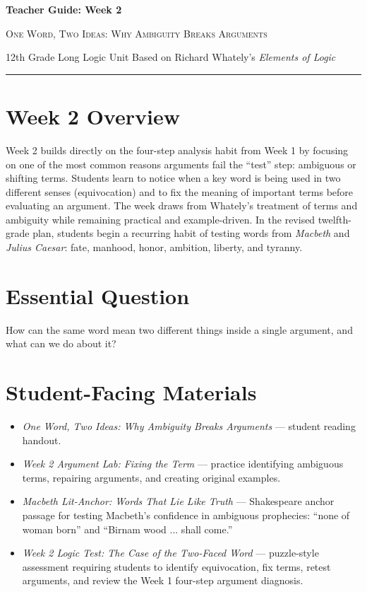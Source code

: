 \documentclass[12pt]{article}
\begin{document}
\begin{center}
{\LARGE\bfseries Teacher Guide: Week 2}\par\vspace{0.25em}
{\large\scshape One Word, Two Ideas: Why Ambiguity Breaks Arguments}\par\vspace{0.4em}
{12th Grade Long Logic Unit Based on Richard Whately's \textit{Elements of Logic}}\par\vspace{0.6em}
\rule{0.82\textwidth}{0.4pt}
\end{center}

\section*{Week 2 Overview}
Week 2 builds directly on the four-step analysis habit from Week 1 by focusing on one of the most common reasons arguments fail the “test” step: ambiguous or shifting terms. Students learn to notice when a key word is being used in two different senses (equivocation) and to fix the meaning of important terms before evaluating an argument. The week draws from Whately's treatment of terms and ambiguity while remaining practical and example-driven. In the revised twelfth-grade plan, students begin a recurring habit of testing words from \textit{Macbeth} and \textit{Julius Caesar}: fate, manhood, honor, ambition, liberty, and tyranny.

\section*{Essential Question}
How can the same word mean two different things inside a single argument, and what can we do about it?

\section*{Student-Facing Materials}
\begin{itemize}[leftmargin=*]
\item \textit{One Word, Two Ideas: Why Ambiguity Breaks Arguments} — student reading handout.
\item \textit{Week 2 Argument Lab: Fixing the Term} — practice identifying ambiguous terms, repairing arguments, and creating original examples.
\item \textit{Macbeth Lit-Anchor: Words That Lie Like Truth} — Shakespeare anchor passage for testing Macbeth's confidence in ambiguous prophecies: ``none of woman born'' and ``Birnam wood ... shall come.''
\item \textit{Week 2 Logic Test: The Case of the Two-Faced Word} — puzzle-style assessment requiring students to identify equivocation, fix terms, retest arguments, and review the Week 1 four-step argument diagnosis.
\end{itemize}
\end{document}
